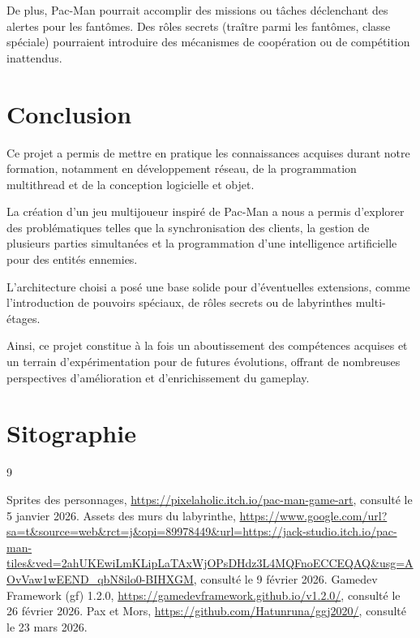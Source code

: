 \documentclass[a4paper, 11pt]{article}
\begin{document}
De plus, Pac-Man pourrait accomplir des missions ou tâches déclenchant des alertes pour les fantômes. Des rôles secrets (traître parmi les fantômes, classe spéciale) pourraient introduire des mécanismes de coopération ou de compétition inattendus.


\newpage


\section*{Conclusion}

Ce projet a permis de mettre en pratique les connaissances acquises durant notre formation, notamment en développement réseau, de la programmation multithread et de la conception logicielle et objet.

La création d’un jeu multijoueur inspiré de Pac-Man a nous a permis d’explorer des problématiques telles que la synchronisation des clients, la gestion de plusieurs parties simultanées et la programmation d’une intelligence artificielle pour des entités ennemies.

L’architecture choisi a posé une base solide pour d’éventuelles extensions, comme l’introduction de pouvoirs spéciaux, de rôles secrets ou de labyrinthes multi-étages.

Ainsi, ce projet constitue à la fois un aboutissement des compétences acquises et un terrain d’expérimentation pour de futures évolutions, offrant de nombreuses perspectives d’amélioration et d’enrichissement du gameplay.



\newpage

\section*{Sitographie}

\begin{thebibliography}{9}

Sprites des personnages, \url{https://pixelaholic.itch.io/pac-man-game-art},
consulté le 5 janvier 2026.
Assets des murs du labyrinthe, \url{https://www.google.com/url?sa=t&source=web&rct=j&opi=89978449&url=https://jack-studio.itch.io/pac-man-tiles&ved=2ahUKEwiLmKLipLaTAxWjOPsDHdz3L4MQFnoECCEQAQ&usg=AOvVaw1wEEND_qbN8ilo0-BIHXGM},
consulté le 9 février 2026.
Gamedev Framework (gf) 1.2.0,
\url{https://gamedevframework.github.io/v1.2.0/},
consulté le 26 février 2026.
Pax et Mors,
\url{https://github.com/Hatunruna/ggj2020/},
consulté le 23 mars 2026.


\end{thebibliography}
\end{document}

